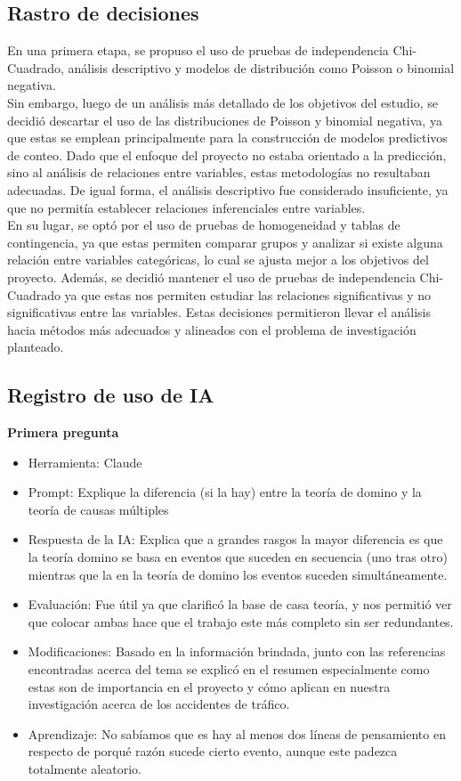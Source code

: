\documentclass[12pt]{article}
\begin{document}
\subsection*{Rastro de decisiones}

En una primera etapa, se propuso el uso de pruebas de independencia Chi-Cuadrado, análisis descriptivo y modelos de distribución como Poisson o binomial negativa.\\
Sin embargo, luego de un análisis más detallado de los objetivos del estudio, se decidió descartar el uso de las distribuciones de Poisson y binomial negativa, 
ya que estas se emplean principalmente para la construcción de modelos predictivos de conteo. 
Dado que el enfoque del proyecto no estaba orientado a la predicción, sino al análisis de relaciones entre variables, estas metodologías no resultaban adecuadas.
De igual forma, el análisis descriptivo fue considerado insuficiente, ya que no permitía establecer relaciones inferenciales entre variables.\\

En su lugar, se optó por el uso de pruebas de homogeneidad y tablas de contingencia, ya que estas permiten comparar grupos y analizar si existe
alguna relación entre variables categóricas, lo cual se ajusta mejor a los objetivos del proyecto. Además, se decidió mantener el uso de pruebas de independencia
Chi-Cuadrado ya que estas nos permiten estudiar las relaciones significativas y no significativas entre las variables.
Estas decisiones permitieron llevar el análisis hacia métodos más adecuados y alineados con el problema de investigación planteado.


\subsection*{Registro de uso de IA}

\textbf{Primera pregunta}
\begin{itemize}
    \item Herramienta: Claude  
    \item Prompt: Explique la diferencia (si la hay) entre la teoría de domino y la teoría de causas múltiples  
    \item Respuesta de la IA: Explica que a grandes rasgos la mayor diferencia es que la teoría domino se basa en eventos que suceden en secuencia (uno tras otro) mientras que la en la teoría de domino los eventos suceden simultáneamente. 
    \item Evaluación: Fue útil ya que clarificó la base de casa teoría, y nos permitió ver que colocar ambas hace que el trabajo este más completo sin ser redundantes.
    \item Modificaciones: Basado en la información brindada, junto con las referencias encontradas acerca del tema se explicó en el resumen especialmente como estas son de importancia en el proyecto y cómo aplican en nuestra investigación acerca de los accidentes de tráfico.  
    \item Aprendizaje: No sabíamos que es hay al menos dos líneas de pensamiento en respecto de porqué razón sucede cierto evento, aunque este padezca totalmente aleatorio.  \\
\end{itemize}
\end{document}
